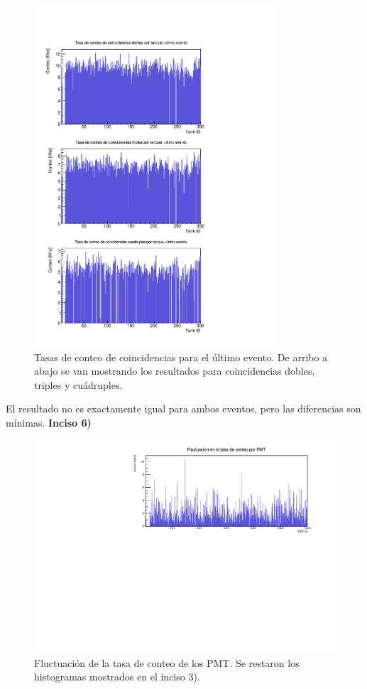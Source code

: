 \documentclass[11pt]{article}
\begin{document}
\begin{figure}[H]
\centering
\includegraphics[width=0.8\textwidth]{../Figuras/Prob5UltimoEvento.pdf}
\caption{Tasas de conteo de coincidencias para el último evento. De arribo a abajo se van mostrando los resultados para coincidencias dobles, triples y cuádruples.}
\label{fig:Prob5-2}
\end{figure}

El resultado no es exactamente igual para ambos eventos, pero las diferencias son mínimas. 
\textbf{Inciso 6)}


\begin{figure}[H]
\centering
\includegraphics[width=1\textwidth]{../Figuras/Fluctuaciones.pdf}
\caption{Fluctuación de la tasa de conteo de los PMT. Se restaron los histogramas mostrados en el inciso 3).}
\label{fig:Prob6}
\end{figure}
\end{document}
